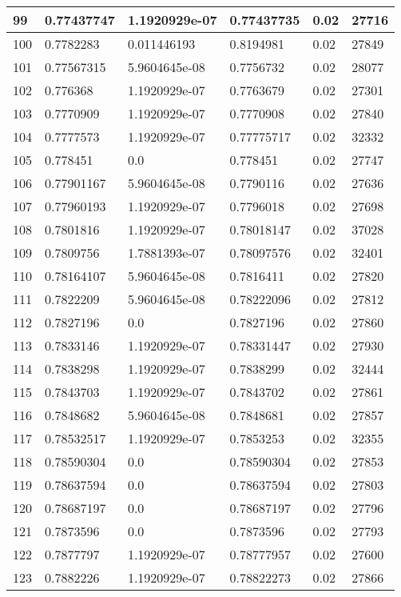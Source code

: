 \begin{longtable}{|l|l|l|l|l|l|}
99 & 0.77437747 & 1.1920929e-07 & 0.77437735 & 0.02 & 27716 \\ \hline 
100 & 0.7782283 & 0.011446193 & 0.8194981 & 0.02 & 27849 \\ \hline 
101 & 0.77567315 & 5.9604645e-08 & 0.7756732 & 0.02 & 28077 \\ \hline 
102 & 0.776368 & 1.1920929e-07 & 0.7763679 & 0.02 & 27301 \\ \hline 
103 & 0.7770909 & 1.1920929e-07 & 0.7770908 & 0.02 & 27840 \\ \hline 
104 & 0.7777573 & 1.1920929e-07 & 0.77775717 & 0.02 & 32332 \\ \hline 
105 & 0.778451 & 0.0 & 0.778451 & 0.02 & 27747 \\ \hline 
106 & 0.77901167 & 5.9604645e-08 & 0.7790116 & 0.02 & 27636 \\ \hline 
107 & 0.77960193 & 1.1920929e-07 & 0.7796018 & 0.02 & 27698 \\ \hline 
108 & 0.7801816 & 1.1920929e-07 & 0.78018147 & 0.02 & 37028 \\ \hline 
109 & 0.7809756 & 1.7881393e-07 & 0.78097576 & 0.02 & 32401 \\ \hline 
110 & 0.78164107 & 5.9604645e-08 & 0.7816411 & 0.02 & 27820 \\ \hline 
111 & 0.7822209 & 5.9604645e-08 & 0.78222096 & 0.02 & 27812 \\ \hline 
112 & 0.7827196 & 0.0 & 0.7827196 & 0.02 & 27860 \\ \hline 
113 & 0.7833146 & 1.1920929e-07 & 0.78331447 & 0.02 & 27930 \\ \hline 
114 & 0.7838298 & 1.1920929e-07 & 0.7838299 & 0.02 & 32444 \\ \hline 
115 & 0.7843703 & 1.1920929e-07 & 0.7843702 & 0.02 & 27861 \\ \hline 
116 & 0.7848682 & 5.9604645e-08 & 0.7848681 & 0.02 & 27857 \\ \hline 
117 & 0.78532517 & 1.1920929e-07 & 0.7853253 & 0.02 & 32355 \\ \hline 
118 & 0.78590304 & 0.0 & 0.78590304 & 0.02 & 27853 \\ \hline 
119 & 0.78637594 & 0.0 & 0.78637594 & 0.02 & 27803 \\ \hline 
120 & 0.78687197 & 0.0 & 0.78687197 & 0.02 & 27796 \\ \hline 
121 & 0.7873596 & 0.0 & 0.7873596 & 0.02 & 27793 \\ \hline 
122 & 0.7877797 & 1.1920929e-07 & 0.78777957 & 0.02 & 27600 \\ \hline 
123 & 0.7882226 & 1.1920929e-07 & 0.78822273 & 0.02 & 27866 \\ \hline 

\end{longtable}

